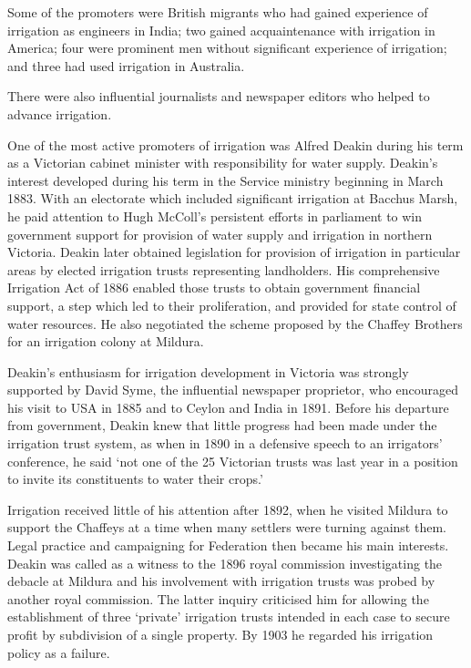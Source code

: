 Some of the promoters were British migrants who had gained experience
of irrigation as engineers in India; two gained acquaintenance with
irrigation in America; four were prominent men without significant
experience of irrigation; and three had used irrigation in Australia.

There were also influential journalists and newspaper editors who
helped to advance irrigation.

One of the most active promoters of irrigation was Alfred Deakin
during his term as a Victorian cabinet minister with responsibility
for water supply.  Deakin's interest developed during his term in the
Service ministry beginning in March 1883.  With an electorate which
included significant irrigation at Bacchus Marsh, he paid attention to
Hugh McColl's persistent efforts in parliament to win government
support for provision of water supply and irrigation in northern
Victoria.  Deakin later obtained legislation for provision of
irrigation in particular areas by elected irrigation trusts
representing landholders.  His comprehensive Irrigation Act of 1886
enabled those trusts to obtain government financial support, a step
which led to their proliferation, and provided for state control of
water resources.  He also negotiated the scheme proposed by the
Chaffey Brothers for an irrigation colony at Mildura.

Deakin's enthusiasm for irrigation development in Victoria was
strongly supported by David Syme, the influential newspaper
proprietor, who encouraged his visit to USA in 1885 and to Ceylon and
India in 1891. Before his departure from government, Deakin knew that
little progress had been made under the irrigation trust system, as
when in 1890 in a defensive speech to an irrigators' conference, he
said `not one of the 25 Victorian trusts was last year in a position
to invite its constituents to water their crops.'

Irrigation received little of his attention after 1892, when he
visited Mildura to support the Chaffeys at a time when many settlers
were turning against them.  Legal practice and campaigning for
Federation then became his main interests. Deakin was called as a
witness to the 1896 royal commission investigating the debacle at
Mildura and his involvement with irrigation trusts was probed by
another royal commission.  The latter inquiry criticised him for
allowing the establishment of three `private' irrigation trusts
intended in each case to secure profit by subdivision of a single
property.  By 1903 he regarded his irrigation policy as a failure.

